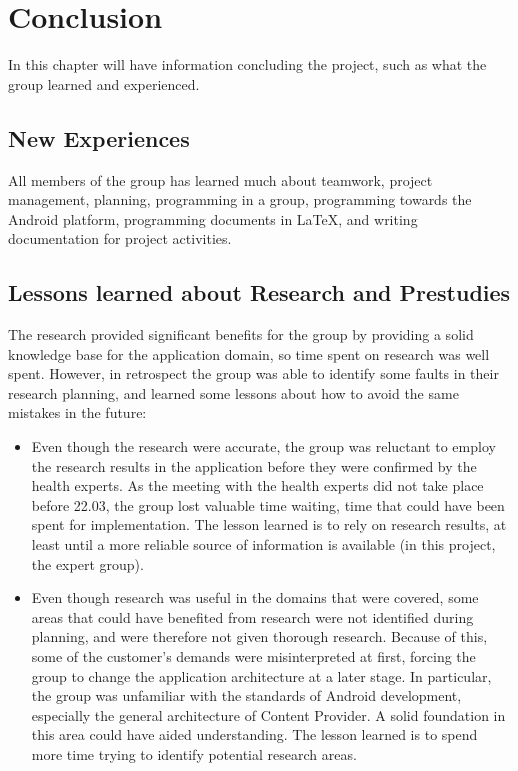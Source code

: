 \chapter{Conclusion}
In this chapter will have information concluding the project, such as what the group learned and experienced.
\section{New Experiences}
All members of the group has learned much about teamwork, project management, planning, programming in a group, programming towards the Android platform, programming documents in LaTeX, and writing documentation for project activities. 


\section{Lessons learned about Research and Prestudies}
The research provided significant benefits for the group by providing a solid knowledge base for the application domain, so time spent on research was well spent. However, in retrospect the group was able to identify some faults in their research planning, and learned some lessons about how to avoid the same mistakes in the future:

\begin{itemize}
\item
Even though the research were accurate, the group was reluctant to employ the research results in the application before they were confirmed by the health experts. As the meeting with the health experts did not take place before 22.03, the group lost valuable time waiting, time that could have been spent for implementation. The lesson learned is to rely on research results, at least until a more reliable source of information is available (in this project, the expert group).
\item
Even though research was useful in the domains that were covered, some areas that could have benefited from research were not identified during planning, and were therefore not given thorough research. Because of this, some of the customer's demands were misinterpreted at first, forcing the group to change the application architecture at a later stage. In particular, the group was unfamiliar with the standards of Android development, especially the general architecture of Content Provider. A solid foundation in this area could have aided understanding. The lesson learned is to spend more time trying to identify potential research areas. 
\end{itemize}

